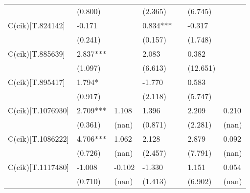 \begin{table}
\begin{center}
\begin{tabular}{lllllll}
                  & (0.800)            &                    & (2.365)              &                      & (6.745)              &                                \\
C(cik)[T.824142]  & -0.171             &                    & 0.834***             &                      & -0.317               &                                \\
                  & (0.241)            &                    & (0.157)              &                      & (1.748)              &                                \\
C(cik)[T.885639]  & 2.837***           &                    & 2.083                &                      & 0.382                &                                \\
                  & (1.097)            &                    & (6.613)              &                      & (12.651)             &                                \\
C(cik)[T.895417]  & 1.794*             &                    & -1.770               &                      & 0.583                &                                \\
                  & (0.917)            &                    & (2.118)              &                      & (5.747)              &                                \\
C(cik)[T.1076930] & 2.709***           & 1.108              & 1.396                &                      & 2.209                & 0.210                          \\
                  & (0.361)            & (nan)              & (0.871)              &                      & (2.281)              & (nan)                          \\
C(cik)[T.1086222] & 4.706***           & 1.062              & 2.128                &                      & 2.879                & 0.092                          \\
                  & (0.726)            & (nan)              & (2.457)              &                      & (7.791)              & (nan)                          \\
C(cik)[T.1117480] & -1.008             & -0.102             & -1.330               &                      & 1.151                & 0.054                          \\
                  & (0.710)            & (nan)              & (1.413)              &                      & (6.902)              & (nan)                          \\

\end{tabular}
\end{center}
\end{table}

